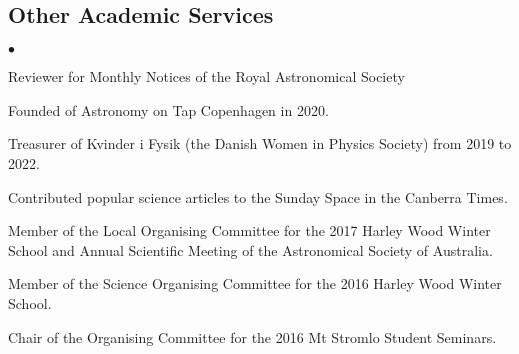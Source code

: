 \documentclass[margin,line]{res}
\newenvironment{list2}{
	\begin{list}{$\bullet$}{%
			\setlength{\itemsep}{0in}
			\setlength{\parsep}{0in} \setlength{\parskip}{0in}
			\setlength{\topsep}{0in} \setlength{\partopsep}{0in} 
			\setlength{\leftmargin}{0.2in}}}{\end{list}}
\begin{document}
\begin{resume}
		\section{\sc Other Academic Services}
		\begin{list2}
			\item Reviewer for Monthly Notices of the Royal Astronomical Society
			\item Founded of Astronomy on Tap Copenhagen in 2020.
			\item Treasurer of Kvinder i Fysik (the Danish Women in Physics Society) from 2019 to 2022.
			\item Contributed popular science articles to the Sunday Space in the Canberra Times. 
			\item Member of the Local Organising Committee for the 2017 Harley Wood Winter School and Annual Scientific Meeting of the Astronomical Society of Australia.
			\item Member of the Science Organising Committee for the 2016 Harley Wood Winter School.
			\item Chair of the Organising Committee for the 2016 Mt Stromlo Student Seminars.
		\end{list2}
		

\end{resume}
\end{document}
